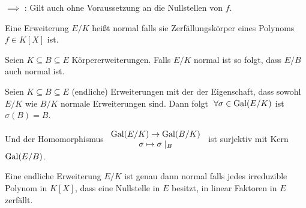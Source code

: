 \begin{claim}
	$\implies$ : Gilt auch ohne Voraussetzung an die Nullstellen von $f$.
\end{claim}



\begin{definition}
	Eine Erweiterung $E / K$ heißt normal falls sie Zerfällungskörper eines Polynoms $f \in K[X]$ ist.
\end{definition}

\begin{claim}
	Seien $K \subseteq B \subseteq E$ Körpererweiterungen. Falls $E / K$ normal ist so folgt, dass $E / B$ auch  normal ist.
\end{claim}

\begin{theorem}
	Seien $K \subseteq B \subseteq E$ (endliche) Erweiterungen mit der der Eigenschaft, dass sowohl $E / K$ wie $B / K$ normale Erweiterungen sind.
	Dann folgt $\forall \sigma \in \gal(E / K)$ ist $\sigma(B) = B$.

	Und der Homomorphismus $\begin{array}{c} \operatorname{Gal}(E / K) \to \operatorname{Gal}(B / K)\\ \sigma \mapsto \sigma \mid_{B}\\ \end{array}$ ist surjektiv mit Kern $\operatorname{Gal}(E / B)$.
\end{theorem}


\begin{theorem}
	Eine endliche Erweiterung $E / K$ ist genau dann normal falls jedes irreduzible Polynom in $K[X]$,
	dass eine Nullstelle in $E$ besitzt, in linear Faktoren in $E$ zerfällt.
\end{theorem}


































